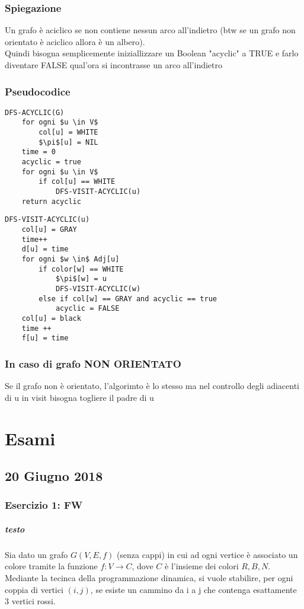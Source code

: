 \documentclass[12pt, a4paper, openany]{book}
\begin{document}
\subsection*{Spiegazione}
Un grafo è aciclico se non contiene nessun arco all'indietro (btw se un grafo non orientato è aciclico allora è un albero).
\\Quindi bisogna semplicemente iniziallizzare un Boolean "acyclic" a TRUE e farlo diventare FALSE qual'ora si incontrasse un arco all'indietro

\subsection*{Pseudocodice}
\begin{lstlisting}[mathescape=true]
DFS-ACYCLIC(G)
    for ogni $u \in V$
        col[u] = WHITE
        $\pi$[u] = NIL
    time = 0
    acyclic = true
    for ogni $u \in V$
        if col[u] == WHITE
            DFS-VISIT-ACYCLIC(u)
    return acyclic    
\end{lstlisting}

\begin{lstlisting}[mathescape=true]
DFS-VISIT-ACYCLIC(u)
    col[u] = GRAY
    time++
    d[u] = time
    for ogni $w \in$ Adj[u]
        if color[w] == WHITE
            $\pi$[w] = u
            DFS-VISIT-ACYCLIC(w)
        else if col[w] == GRAY and acyclic == true
            acyclic = FALSE
    col[u] = black
    time ++
    f[u] = time
\end{lstlisting}

\subsection*{In caso di grafo NON ORIENTATO}
Se il grafo non è orientato, l'algorimto è lo stesso ma nel controllo degli adiacenti di u in visit bisogna togliere il padre di u

\chapter{Esami}
\section{20 Giugno 2018}
\subsection*{Esercizio 1: FW}
\paragraph*{testo} Sia dato un grafo $G(V,E,f)$ (senza cappi) in cui ad ogni vertice è associato un colore tramite la funzione
$f:V\to C$, dove $C$ è l'insieme dei colori $R,B,N$. 
Mediante la tecinca della programmazione dinamica, si vuole stabilire, per ogni coppia di vertici $(i,j)$, se esiste un cammino da i a j
che contenga esattamente 3 vertici rossi.
\end{document}
